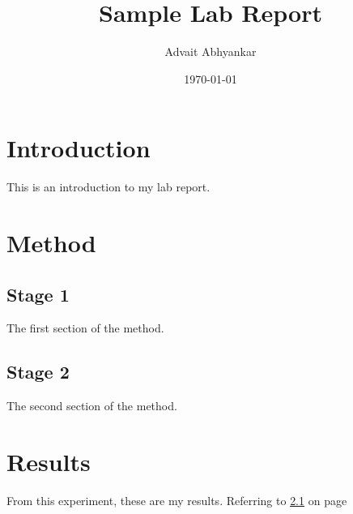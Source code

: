 \documentclass[a4paper,12pt]{article}
\begin{document}
\title{Sample Lab Report}
\author{Advait Abhyankar}
\date{\today}
\maketitle

\section{Introduction}
This is an introduction to my lab report.

\section{Method}

\subsection{Stage 1}
\label{sec1}
The first section of the method.

\subsection{Stage 2}
The second section of the method.

\section{Results}
From this experiment, these are my results. Referring to \ref{sec1} on page \pageref{sec1}
\end{document}
